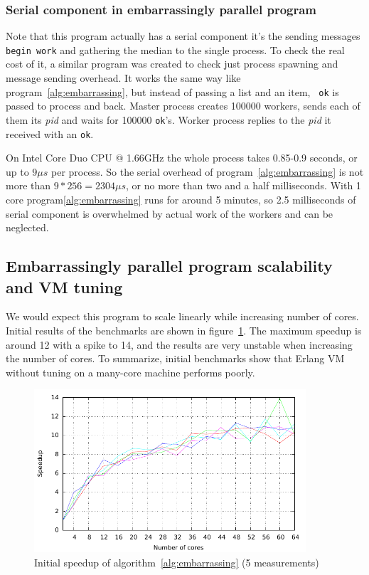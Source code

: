 \documentclass[english,11pt]{l4proj}
\begin{document}
\subsubsection{Serial component in embarrassingly parallel program}

Note that this program actually has a serial component it's the sending messages
{\tt begin work} and gathering the median to the single process. To check the
real cost of it, a similar program was created to check just process spawning
and message sending overhead. It works the same way like
program~\ref{alg:embarrassing}, but instead of passing a list and an item, {\tt
ok} is passed to process and back. Master process creates 100000 workers, sends
each of them its {\em pid} and waits for 100000 {\tt ok}'s. Worker process
replies to the {\em pid} it received with an {\tt ok}.

On Intel Core Duo CPU @ 1.66GHz the whole process takes 0.85-0.9 seconds, or up
to $9\mu s$ per process. So the serial overhead of program~\ref{alg:embarrassing}
is not more than $9*256 = 2304 \mu s$, or no more than two and a half
milliseconds. With 1 core program\ref{alg:embarrassing} runs for around 5
minutes, so 2.5 milliseconds of serial component is overwhelmed by actual work
of the workers and can be neglected.

\subsection{Embarrassingly parallel program scalability and VM tuning}

We would expect this program to scale linearly while increasing number of cores.
Initial results of the benchmarks are shown in figure~\ref{fig:bad_speedup}.
The maximum speedup is around 12 with a spike to 14, and the results are very
unstable when increasing the number of cores. To summarize, initial benchmarks
show that Erlang VM without tuning on a many-core machine performs poorly.

\begin{figure}
    \centering
    \includegraphics[width=0.9\textwidth]{images/bad_speedup.pdf}
    \caption{Initial speedup of algorithm~\ref{alg:embarrassing} (5 measurements)}
    \label{fig:bad_speedup}
\end{figure}
\end{document}
